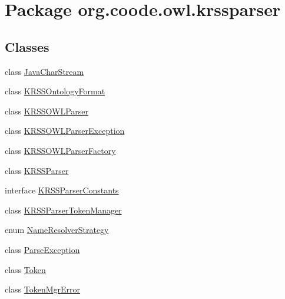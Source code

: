 \hypertarget{namespaceorg_1_1coode_1_1owl_1_1krssparser}{\section{Package org.\-coode.\-owl.\-krssparser}
\label{namespaceorg_1_1coode_1_1owl_1_1krssparser}
}
\subsection*{Classes}
\begin{DoxyCompactItemize}
\item 
class \hyperlink{classorg_1_1coode_1_1owl_1_1krssparser_1_1_java_char_stream}{Java\-Char\-Stream}
\item 
class \hyperlink{classorg_1_1coode_1_1owl_1_1krssparser_1_1_k_r_s_s_ontology_format}{K\-R\-S\-S\-Ontology\-Format}
\item 
class \hyperlink{classorg_1_1coode_1_1owl_1_1krssparser_1_1_k_r_s_s_o_w_l_parser}{K\-R\-S\-S\-O\-W\-L\-Parser}
\item 
class \hyperlink{classorg_1_1coode_1_1owl_1_1krssparser_1_1_k_r_s_s_o_w_l_parser_exception}{K\-R\-S\-S\-O\-W\-L\-Parser\-Exception}
\item 
class \hyperlink{classorg_1_1coode_1_1owl_1_1krssparser_1_1_k_r_s_s_o_w_l_parser_factory}{K\-R\-S\-S\-O\-W\-L\-Parser\-Factory}
\item 
class \hyperlink{classorg_1_1coode_1_1owl_1_1krssparser_1_1_k_r_s_s_parser}{K\-R\-S\-S\-Parser}
\item 
interface \hyperlink{interfaceorg_1_1coode_1_1owl_1_1krssparser_1_1_k_r_s_s_parser_constants}{K\-R\-S\-S\-Parser\-Constants}
\item 
class \hyperlink{classorg_1_1coode_1_1owl_1_1krssparser_1_1_k_r_s_s_parser_token_manager}{K\-R\-S\-S\-Parser\-Token\-Manager}
\item 
enum \hyperlink{enumorg_1_1coode_1_1owl_1_1krssparser_1_1_name_resolver_strategy}{Name\-Resolver\-Strategy}
\item 
class \hyperlink{classorg_1_1coode_1_1owl_1_1krssparser_1_1_parse_exception}{Parse\-Exception}
\item 
class \hyperlink{classorg_1_1coode_1_1owl_1_1krssparser_1_1_token}{Token}
\item 
class \hyperlink{classorg_1_1coode_1_1owl_1_1krssparser_1_1_token_mgr_error}{Token\-Mgr\-Error}
\end{DoxyCompactItemize}
